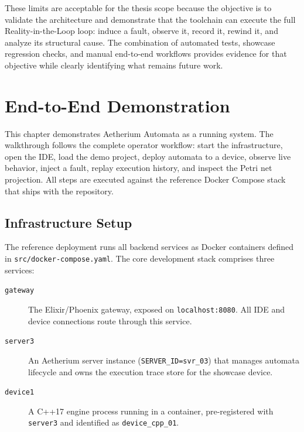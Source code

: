 These limits are acceptable for the thesis scope because the objective is to validate the architecture and demonstrate that the toolchain can execute the full Reality-in-the-Loop loop: induce a fault, observe it, record it, rewind it, and analyze its structural cause. The combination of automated tests, showcase regression checks, and manual end-to-end workflows provides evidence for that objective while clearly identifying what remains future work.

\chapter{End-to-End Demonstration}
\label{chap:demonstration}

This chapter demonstrates Aetherium Automata as a running system.
The walkthrough follows the complete operator workflow: start the infrastructure,
open the IDE, load the demo project, deploy automata to a device, observe live
behavior, inject a fault, replay execution history, and inspect the Petri net
projection. All steps are executed against the reference Docker Compose stack
that ships with the repository.

\section{Infrastructure Setup}
\label{sec:demo-setup}

The reference deployment runs all backend services as Docker containers defined in \texttt{src/\allowbreak{}docker-compose.yaml}. The core development stack comprises three services:

\begin{description}
  \item[\texttt{gateway}] The Elixir/Phoenix gateway, exposed on
    \texttt{localhost:8080}. All IDE and device connections route through this
    service.
  \item[\texttt{server3}] An Aetherium server instance
    (\texttt{SERVER\_ID=svr\_03}) that manages automata lifecycle and owns the
    execution trace store for the showcase device.
  \item[\texttt{device1}] A C++17 engine process running in a container,
    pre-registered with \texttt{server3} and identified as
    \texttt{device\_cpp\_01}.
\end{description}

